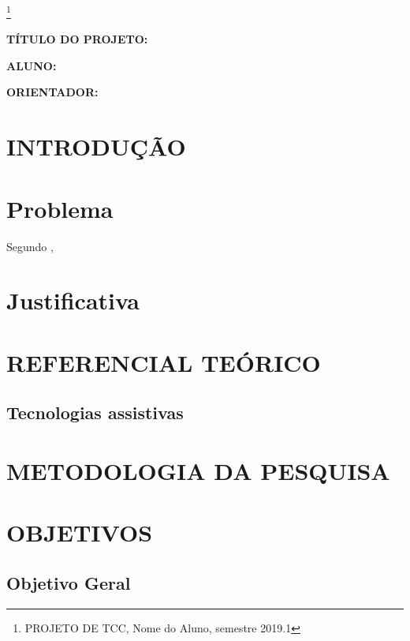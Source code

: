 \documentclass[12pt,openright,oneside,a4paper,ruledheader,pnumromarab,english]{abntex2}
\begin{document}
\footnote{PROJETO DE TCC, Nome do Aluno, semestre 2019.1}





\vspace{0.25cm}
\textbf{TÍTULO DO PROJETO:}  %

\vspace{0.25cm}
\textbf{ALUNO:} %

\vspace{0.25cm}
\textbf{ORIENTADOR:} %

\section{INTRODUÇÃO}


\section{Problema}

Segundo , 


\section{Justificativa}



\section{REFERENCIAL TEÓRICO}


\subsection{Tecnologias assistivas}




\section{METODOLOGIA DA PESQUISA} 


\section{OBJETIVOS} 

\subsection{Objetivo Geral}
\end{document}

